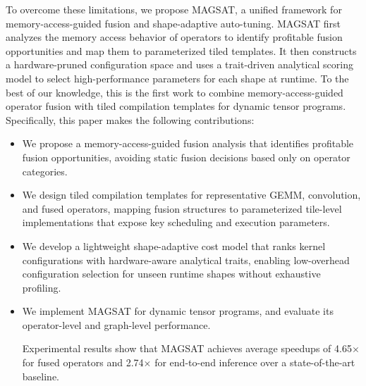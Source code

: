 To overcome these limitations, we propose MAGSAT, a unified framework for
memory-access-guided fusion and shape-adaptive auto-tuning. MAGSAT first
analyzes the memory access behavior of operators to identify profitable
fusion opportunities and map them to parameterized tiled templates. It then
constructs a hardware-pruned configuration space and uses a trait-driven
analytical scoring model to select high-performance parameters for each shape at runtime.
To the best of our knowledge, this is the first work to combine memory-access-guided operator fusion with tiled compilation templates for dynamic tensor programs.
Specifically, this paper makes the following contributions:

\begin{itemize}

\item We propose a memory-access-guided fusion analysis that identifies
profitable fusion opportunities, avoiding static fusion decisions based only on
operator categories. %

\item We design tiled compilation templates for representative GEMM,
convolution, and fused operators, mapping fusion structures to parameterized
tile-level implementations that expose key scheduling and execution parameters.

\item We develop a lightweight shape-adaptive cost model that ranks
kernel configurations with hardware-aware analytical traits, enabling
low-overhead configuration selection for unseen runtime shapes without exhaustive profiling.

\item We implement MAGSAT for dynamic tensor programs,
and evaluate its operator-level and graph-level performance.

Experimental results show that MAGSAT achieves average speedups of
4.65$\times$ for fused operators and 2.74$\times$ for end-to-end inference
over a state-of-the-art baseline.


\end{itemize}
